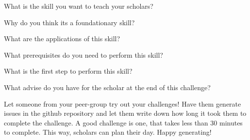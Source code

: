 \begin{challenge}
\begin{task}
        \begin{questions}
            \item What is the skill you want to teach your scholars?
            \item Why do you think its a foundationary skill?
            \item What are the applications of this skill?
            \item What prerequisites do you need to perform this skill?
            \item What is the first step to perform this skill?
            \item What advise do you have for the scholar at the end of this challenge?
        \end{questions}
    \end{task}

    \begin{advise}
        Let someone from your peer-group try out your challenges!
        Have them generate issues in the github repository and let them write down how long it took them to complete the challenge.
        A good challenge is one, that takes less than 30 minutes to complete.
        This way, scholars can plan their day.
        Happy generating!
    \end{advise}
\end{challenge}